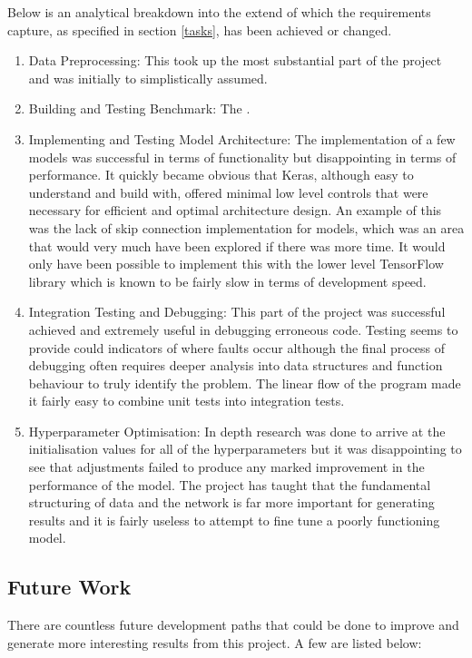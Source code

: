 \documentclass[10pt,onecolumn,letterpaper]{article}
\begin{document}
Below is an analytical breakdown into the extend of which the requirements capture, as specified in section \ref{tasks}, has been achieved or changed. 

\begin{enumerate}
	\item Data Preprocessing: This took up the most substantial part of the project and was initially to simplistically assumed.
	 \item Building and Testing Benchmark: The . 
	\item Implementing and Testing Model Architecture: The implementation of a few models was successful in terms of functionality but disappointing in terms of performance. It quickly became obvious that Keras, although easy to understand and build with, offered minimal low level controls that were necessary for efficient and optimal architecture design. An example of this was the lack of skip connection implementation for models, which was an area that would very much have been explored if there was more time. It would only have been possible to implement this with the lower level TensorFlow library which is known to be fairly slow in terms of development speed.
	\item Integration Testing and Debugging: This part of the project was successful achieved and extremely useful in debugging erroneous code. Testing seems to provide could indicators of where faults occur although the final process of debugging often requires deeper analysis into data structures and function behaviour to truly identify the problem. The linear flow of the program made it fairly easy to combine unit tests into integration tests.
	\item Hyperparameter Optimisation: In depth research was done to arrive at the initialisation values for all of the hyperparameters but it was disappointing to see that adjustments failed to produce any marked improvement in the performance of the model. The project has taught that the fundamental structuring of data and the network is far more important for generating results and it is fairly useless to attempt to fine tune a poorly functioning model.  
\end{enumerate}

\subsection{Future Work} 

There are countless future development paths that could be done to improve and generate more interesting results from this project. A few are listed below:  
\end{document}
